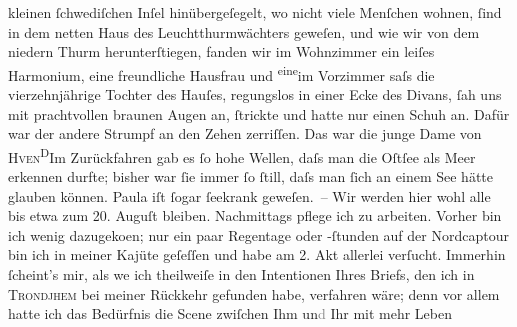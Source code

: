                kleinen ſchwe{\pb}diſchen Inſel hinübergeſegelt, wo nicht viele
               Menſchen wohnen,{ }ſind in dem netten Haus des Leuchtthurmwächters geweſen, und wie wir von dem niedern
               Thurm herunterſtiegen, fanden wir im Wohnzimmer ein leiſes Harmonium, eine
               freundliche Hausfrau und \substVorne{}\textsuperscript{eine}\substDazwischen{}im\substHinten{} Vorzimmer saſs die vierzehnjährige Tochter des Hauſes, regungslos in einer Ecke des Divans,{ }ſah uns mit prachtvollen braunen Augen an, {\pb}ſtrickte und
               hatte nur einen Schuh an. Dafür war der andere Strumpf an den Zehen zerriſſen. Das
               war die junge Dame von \textsc{Hven}\substVorne{}\textsuperscript{D}\substDazwischen{}I\substHinten{}m Zurückfahren gab es{ }ſo hohe Wellen, daſs man die Oſtſee als Meer erkennen durfte; bisher war{ }ſie immer{ }ſo{ }ſtill, daſs man{ }ſich an einem See hätte glauben können. Paula iſt{ }ſogar{ }ſeekrank geweſen. – Wir werden hier wohl alle
               bis etwa zum 20. Auguſt bleiben. Nachmittags pflege ich zu
               arbeiten. Vorher bin ich {\pb}wenig dazugeko{\geminationm}en; nur ein paar Regentage oder -ſtunden auf der Nordcaptour bin ich in meiner Kajüte geſeſſen
               und habe am 2. Akt allerlei
               verſucht. Immerhin{ }ſcheint’s mir, als we{\geminationn} ich theilweiſe
               in den Intentionen Ihres Briefs, den ich in \textsc{Trondjhem} bei meiner Rückkehr gefunden habe, verfahren wäre; denn vor allem hatte ich das
               Bedürfnis die Scene zwiſchen Ihm un\textcolor{gray}{d} Ihr mit mehr Leben

